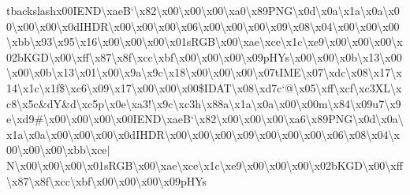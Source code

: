 tbackslash{}x00\+I\+E\+N\+D\textbackslash{}xae\+B`\textbackslash{}x82\textbackslash{}x00\textbackslash{}x00\textbackslash{}x00\textbackslash{}xa0\textbackslash{}x89\+P\+N\+G\textbackslash{}x0d\textbackslash{}x0a\textbackslash{}x1a\textbackslash{}x0a\textbackslash{}x00\textbackslash{}x00\textbackslash{}x00\textbackslash{}x0d\+I\+H\+D\+R\textbackslash{}x00\textbackslash{}x00\textbackslash{}x00\textbackslash{}x06\textbackslash{}x00\textbackslash{}x00\textbackslash{}x00\textbackslash{}x09\textbackslash{}x08\textbackslash{}x04\textbackslash{}x00\textbackslash{}x00\textbackslash{}x00\textbackslash{}xbb\textbackslash{}x93\textbackslash{}x95\textbackslash{}x16\textbackslash{}x00\textbackslash{}x00\textbackslash{}x00\textbackslash{}x01s\+R\+G\+B\textbackslash{}x00\textbackslash{}xae\textbackslash{}xce\textbackslash{}x1c\textbackslash{}xe9\textbackslash{}x00\textbackslash{}x00\textbackslash{}x00\textbackslash{}x02b\+K\+G\+D\textbackslash{}x00\textbackslash{}xff\textbackslash{}x87\textbackslash{}x8f\textbackslash{}xcc\textbackslash{}xbf\textbackslash{}x00\textbackslash{}x00\textbackslash{}x00\textbackslash{}x09p\+H\+Ys\textbackslash{}x00\textbackslash{}x00\textbackslash{}x0b\textbackslash{}x13\textbackslash{}x00\textbackslash{}x00\textbackslash{}x0b\textbackslash{}x13\textbackslash{}x01\textbackslash{}x00\textbackslash{}x9a\textbackslash{}x9c\textbackslash{}x18\textbackslash{}x00\textbackslash{}x00\textbackslash{}x00\textbackslash{}x07t\+I\+M\+E\textbackslash{}x07\textbackslash{}xdc\textbackslash{}x08\textbackslash{}x17\textbackslash{}x14\textbackslash{}x1c\textbackslash{}x1f\$\textbackslash{}xc6\textbackslash{}x09\textbackslash{}x17\textbackslash{}x00\textbackslash{}x00\textbackslash{}x00\$\+I\+D\+A\+T\textbackslash{}x08\textbackslash{}xd7c`@\textbackslash{}x05\textbackslash{}xff\textbackslash{}xcf\textbackslash{}xc3\+X\+L\textbackslash{}xc8\textbackslash{}x5c\&d\+Y\&d\textbackslash{}xc5p\textbackslash{}x0e\textbackslash{}xa3!\textbackslash{}x9c\textbackslash{}xc3h\textbackslash{}x88a\textbackslash{}x1a\textbackslash{}x0a\textbackslash{}x00\textbackslash{}x00m\textbackslash{}x84\textbackslash{}x09u7\textbackslash{}x9e\textbackslash{}xd9\#\textbackslash{}x00\textbackslash{}x00\textbackslash{}x00\textbackslash{}x00\+I\+E\+N\+D\textbackslash{}xae\+B`\textbackslash{}x82\textbackslash{}x00\textbackslash{}x00\textbackslash{}x00\textbackslash{}xa6\textbackslash{}x89\+P\+N\+G\textbackslash{}x0d\textbackslash{}x0a\textbackslash{}x1a\textbackslash{}x0a\textbackslash{}x00\textbackslash{}x00\textbackslash{}x00\textbackslash{}x0d\+I\+H\+D\+R\textbackslash{}x00\textbackslash{}x00\textbackslash{}x00\textbackslash{}x09\textbackslash{}x00\textbackslash{}x00\textbackslash{}x00\textbackslash{}x06\textbackslash{}x08\textbackslash{}x04\textbackslash{}x00\textbackslash{}x00\textbackslash{}x00\textbackslash{}xbb\textbackslash{}xce$\vert$\+N\textbackslash{}x00\textbackslash{}x00\textbackslash{}x00\textbackslash{}x01s\+R\+G\+B\textbackslash{}x00\textbackslash{}xae\textbackslash{}xce\textbackslash{}x1c\textbackslash{}xe9\textbackslash{}x00\textbackslash{}x00\textbackslash{}x00\textbackslash{}x02b\+K\+G\+D\textbackslash{}x00\textbackslash{}xff\textbackslash{}x87\textbackslash{}x8f\textbackslash{}xcc\textbackslash{}xbf\textbackslash{}x00\textbackslash{}x00\textbackslash{}x00\textbackslash{}x09p\+H\+Ys\textbacksla